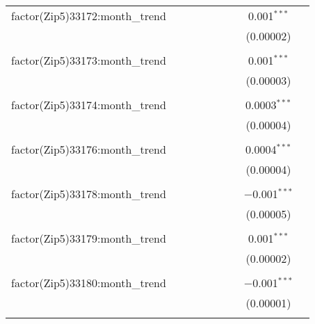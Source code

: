 \begin{table}[H]
{\begin{tabular}{@{\extracolsep{5pt}}lcccccccc}
  factor(Zip5)33172:month\_trend &  &  &  &  &  &  & 0.001$^{***}$ &  \\  

   &  &  &  &  &  &  & (0.00002) &  \\  

   & & & & & & & & \\  

  factor(Zip5)33173:month\_trend &  &  &  &  &  &  & 0.001$^{***}$ &  \\  

   &  &  &  &  &  &  & (0.00003) &  \\  

   & & & & & & & & \\  

  factor(Zip5)33174:month\_trend &  &  &  &  &  &  & 0.0003$^{***}$ &  \\  

   &  &  &  &  &  &  & (0.00004) &  \\  

   & & & & & & & & \\  

  factor(Zip5)33176:month\_trend &  &  &  &  &  &  & 0.0004$^{***}$ &  \\  

   &  &  &  &  &  &  & (0.00004) &  \\  

   & & & & & & & & \\  

  factor(Zip5)33178:month\_trend &  &  &  &  &  &  & $-$0.001$^{***}$ &  \\  

   &  &  &  &  &  &  & (0.00005) &  \\  

   & & & & & & & & \\  

  factor(Zip5)33179:month\_trend &  &  &  &  &  &  & 0.001$^{***}$ &  \\  

   &  &  &  &  &  &  & (0.00002) &  \\  

   & & & & & & & & \\  

  factor(Zip5)33180:month\_trend &  &  &  &  &  &  & $-$0.001$^{***}$ &  \\  

   &  &  &  &  &  &  & (0.00001) &  \\  

   & & & & & & & & \\  


\end{tabular}}
\end{table}
